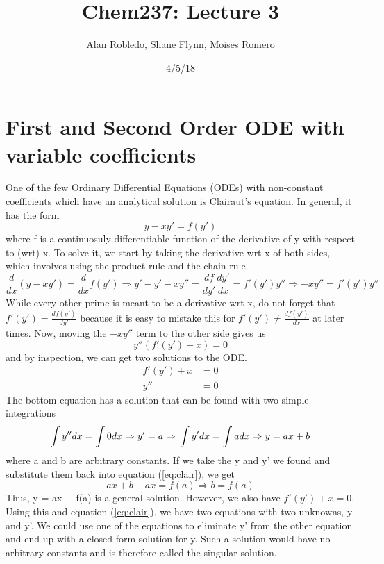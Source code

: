 \documentclass{article}
\title{Chem237: Lecture 3}
\date{4/5/18}
\author{Alan Robledo, Shane Flynn, Moises Romero}
\newcommand{\be}{\begin{equation}}
\newcommand{\ee}{\end{equation}}
\begin{document}
\maketitle
\section*{First and Second Order ODE with variable coefficients}
One of the few Ordinary Differential Equations (ODEs) with non-constant coefficients which have an analytical solution is Clairaut's equation.
In general, it has the form
\be \label{eq:clair}
y - x y' = f(y')
\ee
where f is a continuosuly differentiable function of the derivative of y with respect to (wrt) x.
To solve it, we start by taking the derivative wrt x of both sides, which involves using the product rule and the chain rule.
\be
\frac{d}{dx} (y - x y') = \frac{d}{dx}f(y') \Rightarrow y' - y' - xy'' = \frac{df}{dy'} \frac{dy'}{dx} = f'(y') y''
\Rightarrow -xy'' = f'(y') y''
\ee
While every other prime is meant to be a derivative wrt x, do not forget that $f'(y') = \frac{df(y')}{dy'}$ because it is easy to mistake this for $f'(y') \neq \frac{df(y')}{dx}$ at later times.
Now, moving the $-xy''$ term to the other side gives us
\be
y''(f'(y') + x) = 0
\ee
and by inspection, we can get two solutions to the ODE.
\be
\begin{split}
f'(y') + x &= 0 \\
y'' &= 0
\end{split}
\ee
The bottom equation has a solution that can be found with two simple integrations
\be
\int y'' dx = \int 0 dx \Rightarrow y' = a \Rightarrow \\
\int y' dx = \int a dx \Rightarrow y = ax + b
\ee
where a and b are arbitrary constants.
If we take the y and y' we found and substitute them back into equation (\ref{eq:clair}), we get
\be
ax + b - ax = f(a) \Rightarrow b = f(a)
\ee
Thus, y = ax + f(a) is a general solution.
However, we also have $f'(y') + x = 0$.
Using this and equation (\ref{eq:clair}), we have two equations with two unknowns, y and y'.
We could use one of the equations to eliminate y' from the other equation and end up with a closed form solution for y.
Such a solution would have no arbitrary constants and is therefore called the singular solution.
\end{document}
